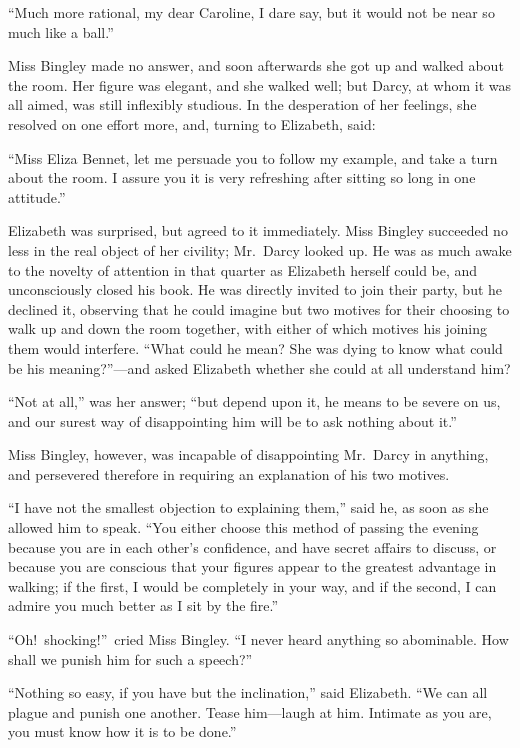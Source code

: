 \documentclass[12pt,english,oneside]{book}
\begin{document}
{}``Much more rational, my dear Caroline, I dare say, but it would
not be near so much like a ball.''

Miss Bingley made no answer, and soon afterwards she got up and walked
about the room. Her figure was elegant, and she walked well; but Darcy,
at whom it was all aimed, was still inflexibly studious. In the desperation
of her feelings, she resolved on one effort more, and, turning to
Elizabeth, said:

{}``Miss Eliza Bennet, let me persuade you to follow my example,
and take a turn about the room. I assure you it is very refreshing
after sitting so long in one attitude.''

Elizabeth was surprised, but agreed to it immediately. Miss Bingley
succeeded no less in the real object of her civility; Mr.\ Darcy
looked up. He was as much awake to the novelty of attention in that
quarter as Elizabeth herself could be, and unconsciously closed his
book. He was directly invited to join their party, but he declined
it, observing that he could imagine but two motives for their choosing
to walk up and down the room together, with either of which motives
his joining them would interfere. {}``What could he mean? She was
dying to know what could be his meaning?''---and asked Elizabeth
whether she could at all understand him?

{}``Not at all,'' was her answer; {}``but depend upon it, he means
to be severe on us, and our surest way of disappointing him will be
to ask nothing about it.''

Miss Bingley, however, was incapable of disappointing Mr.\ Darcy
in anything, and persevered therefore in requiring an explanation
of his two motives.

{}``I have not the smallest objection to explaining them,'' said
he, as soon as she allowed him to speak. {}``You either choose this
method of passing the evening because you are in each other's confidence,
and have secret affairs to discuss, or because you are conscious that
your figures appear to the greatest advantage in walking; if the first,
I would be completely in your way, and if the second, I can admire
you much better as I sit by the fire.''

{}``Oh!\ shocking!''\ cried Miss Bingley. {}``I never heard anything
so abominable. How shall we punish him for such a speech?''\ 

{}``Nothing so easy, if you have but the inclination,'' said Elizabeth.
{}``We can all plague and punish one another. Tease him\mbox{---}laugh
at him. Intimate as you are, you must know how it is to be done.''
\end{document}
